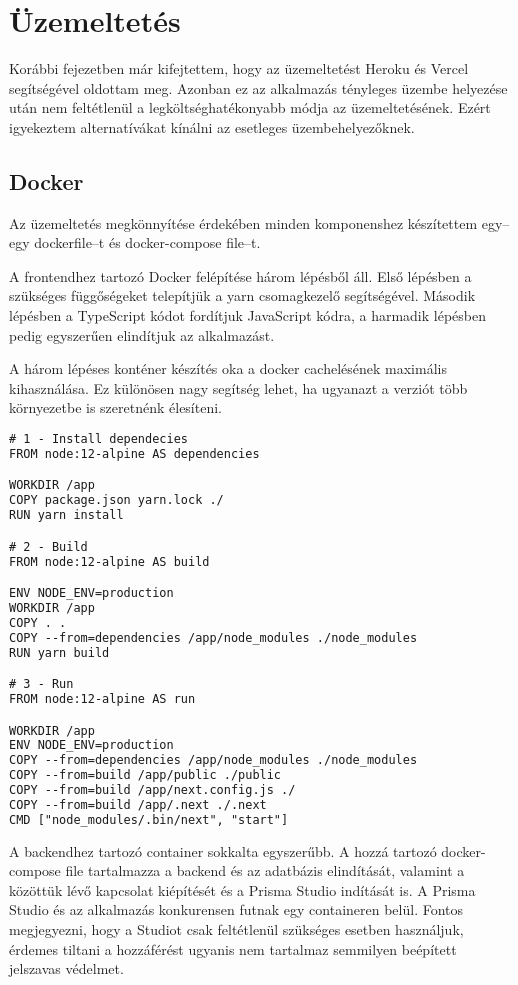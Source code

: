 \chapter{Üzemeltetés}
Korábbi fejezetben már kifejtettem, hogy az üzemeltetést Heroku és Vercel segítségével oldottam meg.
Azonban ez az alkalmazás tényleges üzembe helyezése után nem feltétlenül a legköltséghatékonyabb módja az üzemeltetésének.
Ezért igyekeztem alternatívákat kínálni az esetleges üzembehelyezőknek.

\section{Docker}
Az üzemeltetés megkönnyítése érdekében minden komponenshez készítettem egy–egy dockerfile–t és docker-compose file–t.

A frontendhez tartozó Docker felépítése három lépésből áll. Első lépésben a szükséges függőségeket telepítjük a yarn csomagkezelő segítségével.
Második lépésben a TypeScript kódot fordítjuk JavaScript kódra, a harmadik lépésben pedig egyszerűen elindítjuk az alkalmazást.

A három lépéses konténer készítés oka a docker cachelésének maximális kihasználása.
Ez különösen nagy segítség lehet, ha ugyanazt a verziót több környezetbe is szeretnénk élesíteni.

\begin{lstlisting}[language=TeX, caption=Frontend Dockerfile]
# 1 - Install dependecies
FROM node:12-alpine AS dependencies

WORKDIR /app
COPY package.json yarn.lock ./
RUN yarn install

# 2 - Build
FROM node:12-alpine AS build

ENV NODE_ENV=production
WORKDIR /app
COPY . .
COPY --from=dependencies /app/node_modules ./node_modules
RUN yarn build

# 3 - Run
FROM node:12-alpine AS run

WORKDIR /app
ENV NODE_ENV=production
COPY --from=dependencies /app/node_modules ./node_modules
COPY --from=build /app/public ./public
COPY --from=build /app/next.config.js ./
COPY --from=build /app/.next ./.next
CMD ["node_modules/.bin/next", "start"]
\end{lstlisting}

A backendhez tartozó container sokkalta egyszerűbb. 
A hozzá tartozó docker-compose file tartalmazza a backend és az adatbázis elindítását, valamint a közöttük lévő kapcsolat kiépítését és a Prisma Studio indítását is.
A Prisma Studio és az alkalmazás konkurensen futnak egy containeren belül.
Fontos megjegyezni, hogy a Studiot csak feltétlenül szükséges esetben használjuk, érdemes tiltani a hozzáférést ugyanis nem tartalmaz semmilyen beépített jelszavas védelmet.

